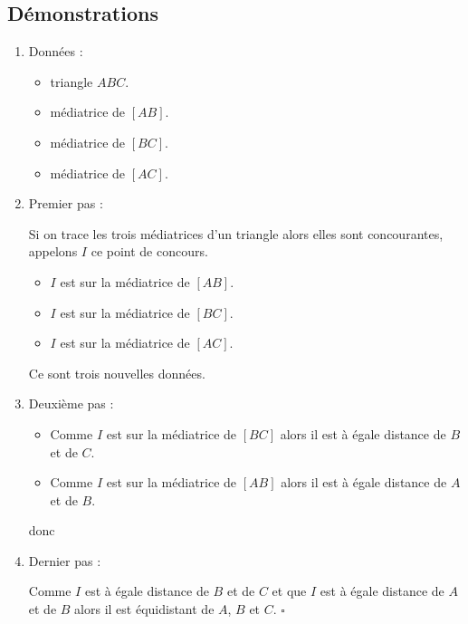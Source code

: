 \begin{changemargin}{0mm}{-15mm}
    \subsection{Démonstrations}
    \begin{preuve}
        \begin{enumerate}
            \item Données :
                  \begin{itemize}
                      \item  triangle $ABC$.
                      \item  médiatrice de $[AB]$.
                      \item  médiatrice de $[BC]$.
                      \item  médiatrice de $[AC]$.
                  \end{itemize}
            \item Premier pas :
                  \par
                  Si on trace les trois médiatrices d'un triangle alors elles sont concourantes, appelons $I$ ce point de concours.
                  \par
                  \begin{itemize}
                      \item  $I$ est sur la médiatrice de $[AB]$.
                      \item  $I$ est sur la médiatrice de $[BC]$.
                      \item  $I$ est sur la médiatrice de $[AC]$.
                  \end{itemize}
                  \par
                  Ce sont trois nouvelles données.
            \item Deuxième pas :
                  \par
                  \begin{itemize}
                      \item  Comme $I$ est sur la médiatrice de $[BC]$ alors il est à égale distance de $B$ et de $C$.
                      \item  Comme $I$ est sur la médiatrice de $[AB]$ alors il est à égale distance de $A$ et de $B$.
                  \end{itemize}
                  donc
            \item Dernier pas :
                  \par\vspace{0.25cm}
                  Comme $I$ est à égale distance de $B$ et de $C$ et que $I$ est à égale distance de $A$ et de $B$ alors il est équidistant de $A$, $B$ et $C$. $\square$
        \end{enumerate}
    \end{preuve}


\end{changemargin}

